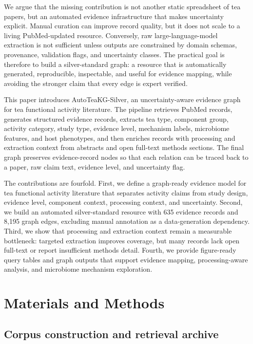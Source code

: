 \documentclass[11pt]{article}
\begin{document}
We argue that the missing contribution is not another static spreadsheet of tea papers, but an automated evidence infrastructure that makes uncertainty explicit. Manual curation can improve record quality, but it does not scale to a living PubMed-updated resource. Conversely, raw large-language-model extraction is not sufficient unless outputs are constrained by domain schemas, provenance, validation flags, and uncertainty classes. The practical goal is therefore to build a silver-standard graph: a resource that is automatically generated, reproducible, inspectable, and useful for evidence mapping, while avoiding the stronger claim that every edge is expert verified.

This paper introduces AutoTeaKG-Silver, an uncertainty-aware evidence graph for tea functional activity literature. The pipeline retrieves PubMed records, generates structured evidence records, extracts tea type, component group, activity category, study type, evidence level, mechanism labels, microbiome features, and host phenotypes, and then enriches records with processing and extraction context from abstracts and open full-text methods sections. The final graph preserves evidence-record nodes so that each relation can be traced back to a paper, raw claim text, evidence level, and uncertainty flag.

The contributions are fourfold. First, we define a graph-ready evidence model for tea functional activity literature that separates activity claims from study design, evidence level, component context, processing context, and uncertainty. Second, we build an automated silver-standard resource with 635 evidence records and 8,195 graph edges, excluding manual annotation as a data-generation dependency. Third, we show that processing and extraction context remain a measurable bottleneck: targeted extraction improves coverage, but many records lack open full-text or report insufficient methods detail. Fourth, we provide figure-ready query tables and graph outputs that support evidence mapping, processing-aware analysis, and microbiome mechanism exploration.

\section{Materials and Methods}

\subsection{Corpus construction and retrieval archive}
\end{document}
